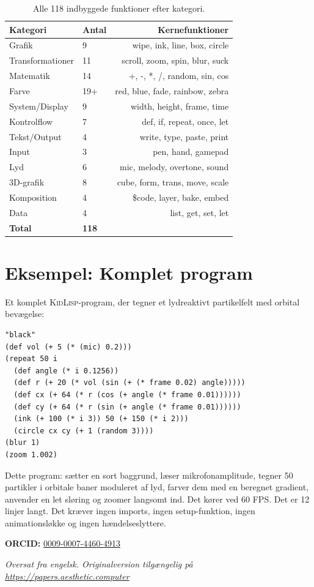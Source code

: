 \documentclass[10pt,letterpaper,twocolumn]{article}
\newcommand{\kl}{\textsc{KidLisp}}
\begin{document}
\begin{table}[h]
\small\centering
\begin{tabularx}{\columnwidth}{Xlr}
\toprule
\textbf{Kategori} & \textbf{Antal} & \textbf{Kernefunktioner} \\
\midrule
Grafik & 9 & wipe, ink, line, box, circle \\
Transformationer & 11 & scroll, zoom, spin, blur, suck \\
Matematik & 14 & +, -, *, /, random, sin, cos \\
Farve & 19+ & red, blue, fade, rainbow, zebra \\
System/Display & 9 & width, height, frame, time \\
Kontrolflow & 7 & def, if, repeat, once, let \\
Tekst/Output & 4 & write, type, paste, print \\
Input & 3 & pen, hand, gamepad \\
Lyd & 6 & mic, melody, overtone, sound \\
3D-grafik & 8 & cube, form, trans, move, scale \\
Komposition & 4 & \$code, layer, bake, embed \\
Data & 4 & list, get, set, let \\
\midrule
\textbf{Total} & \textbf{118} & \\
\bottomrule
\end{tabularx}
\caption{Alle 118 indbyggede funktioner efter kategori.}
\label{tab:builtins}
\end{table}

\section{Eksempel: Komplet program}

Et komplet \kl{}-program, der tegner et lydreaktivt partikelfelt med orbital bevægelse:

\begin{lstlisting}
"black"
(def vol (+ 5 (* (mic) 0.2)))
(repeat 50 i
  (def angle (* i 0.1256))
  (def r (+ 20 (* vol (sin (+ (* frame 0.02) angle)))))
  (def cx (+ 64 (* r (cos (+ angle (* frame 0.01))))))
  (def cy (+ 64 (* r (sin (+ angle (* frame 0.01))))))
  (ink (+ 100 (* i 3)) 50 (+ 150 (* i 2)))
  (circle cx cy (+ 1 (random 3))))
(blur 1)
(zoom 1.002)
\end{lstlisting}

Dette program: sætter en sort baggrund, læser mikrofonamplitude, tegner 50 partikler i orbitale baner moduleret af lyd, farver dem med en beregnet gradient, anvender en let sløring og zoomer langsomt ind. Det kører ved 60 FPS. Det er 12 linjer langt. Det kræver ingen imports, ingen setup-funktion, ingen animationsløkke og ingen hændelseslyttere.

\vspace{0.5em}
\noindent\textbf{ORCID:} \href{https://orcid.org/0009-0007-4460-4913}{0009-0007-4460-4913}

\vspace{0.5em}\noindent\textit{Oversat fra engelsk. Originalversion tilgængelig på \url{https://papers.aesthetic.computer}}



\end{document}
